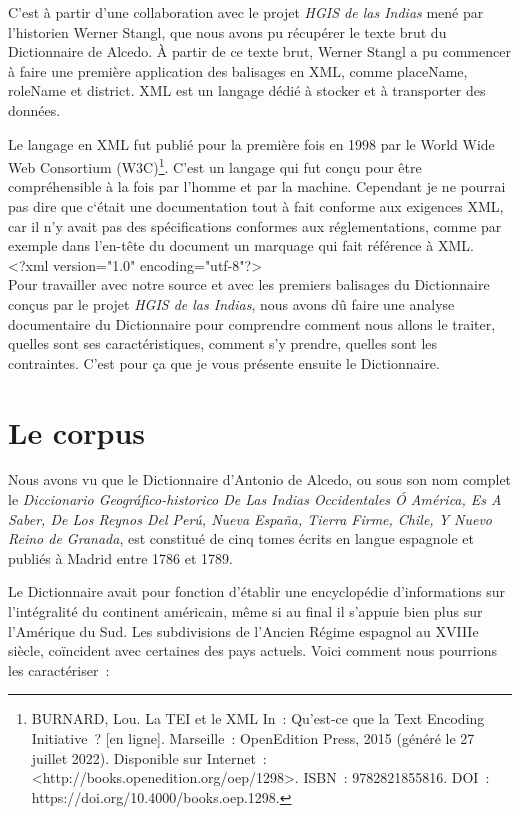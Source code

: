 \documentclass[a4paper,12pt,twoside]{book}
\begin{document}
C’est à partir d’une collaboration avec le projet \textit{HGIS de las Indias} mené par l'historien Werner Stangl, que nous avons pu récupérer le texte brut du Dictionnaire de Alcedo. À partir de ce texte brut, Werner Stangl a pu commencer à faire une première application des balisages en \Gls{XML}, comme placeName, roleName et district. XML est un langage dédié à stocker et à transporter des données. 

Le langage en XML fut publié pour la première fois en 1998 par le World Wide Web Consortium (W3C)\footnote{BURNARD, Lou. La TEI et le XML In : Qu’est-ce que la Text Encoding Initiative ? [en ligne]. Marseille : OpenEdition Press, 2015 (généré le 27 juillet 2022). Disponible sur Internet : <http://books.openedition.org/oep/1298>. ISBN : 9782821855816. DOI : https://doi.org/10.4000/books.oep.1298.}. C’est un langage qui fut conçu pour être compréhensible à la fois par l’homme et par la machine. Cependant je ne pourrai pas dire que c‘était une documentation tout à fait conforme aux exigences XML, car il n’y avait pas des spécifications conformes aux réglementations, comme par exemple dans l’en-tête du document un marquage qui fait référence à XML.\\

           <?xml version="1.0" encoding="utf-8"?>\\

Pour travailler avec notre source et avec les premiers balisages du Dictionnaire conçus par le projet \textit{HGIS de las Indias}, nous avons dû faire une analyse documentaire du Dictionnaire pour comprendre comment nous allons le traiter, quelles sont ses caractéristiques, comment s’y prendre, quelles sont les contraintes. C’est pour ça que je vous présente ensuite le Dictionnaire. 
	
	\section{Le corpus}
	
Nous avons vu que le Dictionnaire d’Antonio de Alcedo, ou sous son nom complet le \textit{Diccionario Geográfico-historico De Las Indias Occidentales Ó América, Es A Saber, De Los Reynos Del Perú, Nueva España, Tierra Firme, Chile, Y Nuevo Reino de Granada}, est constitué de cinq tomes écrits en langue espagnole et publiés à Madrid entre 1786 et 1789.
	

Le Dictionnaire avait pour fonction d’établir une encyclopédie d’informations sur l’intégralité du continent américain, même si au final il s’appuie bien plus sur l’Amérique du Sud. Les subdivisions de l’Ancien Régime espagnol au XVIIIe siècle, coïncident avec certaines des pays actuels. Voici comment nous pourrions les caractériser :\\
	
\end{document}

